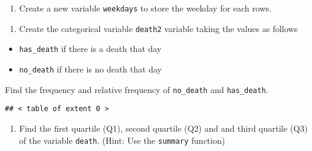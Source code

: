\documentclass[
]{article}
\newenvironment{Shaded}{\begin{snugshade}}{\end{snugshade}}
\newcommand{\DecValTok}[1]{\textcolor[rgb]{0.00,0.00,0.81}{#1}}
\newcommand{\FunctionTok}[1]{\textcolor[rgb]{0.00,0.00,0.00}{#1}}
\newcommand{\NormalTok}[1]{#1}
\newcommand{\OtherTok}[1]{\textcolor[rgb]{0.56,0.35,0.01}{#1}}
\newcommand{\SpecialCharTok}[1]{\textcolor[rgb]{0.00,0.00,0.00}{#1}}
\newcommand{\StringTok}[1]{\textcolor[rgb]{0.31,0.60,0.02}{#1}}
\providecommand{\tightlist}{%
  \setlength{\itemsep}{0pt}\setlength{\parskip}{0pt}}
\begin{document}
\begin{enumerate}
\def\labelenumi{\arabic{enumi}.}
\setcounter{enumi}{8}
\tightlist
\item
  Create a new variable \texttt{weekdays} to store the weekday for each
  rows.
\end{enumerate}

\begin{Shaded}
\end{Shaded}

\begin{enumerate}
\def\labelenumi{\arabic{enumi}.}
\setcounter{enumi}{9}
\tightlist
\item
  Create the categorical variable \texttt{death2} variable taking the
  values as follows
\end{enumerate}

\begin{itemize}
\tightlist
\item
  \texttt{has\_death} if there is a death that day
\item
  \texttt{no\_death} if there is no death that day
\end{itemize}

Find the frequency and relative frequency of \texttt{no\_death} and
\texttt{has\_death}.

\begin{Shaded}
\end{Shaded}

\begin{verbatim}
## < table of extent 0 >
\end{verbatim}

\begin{enumerate}
\def\labelenumi{\arabic{enumi}.}
\setcounter{enumi}{10}
\tightlist
\item
  Find the first quartile (Q1), second quartile (Q2) and and third
  quartile (Q3) of the variable \texttt{death}. (Hint: Use the
  \texttt{summary} function)
\end{enumerate}
\end{document}
